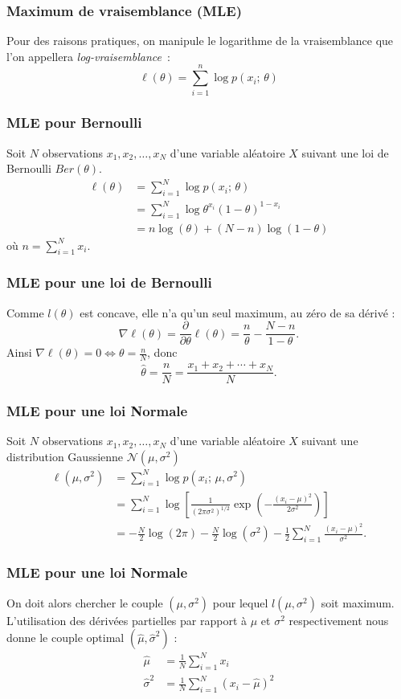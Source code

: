 \begin{frame}
  \frametitle{Maximum de vraisemblance (MLE)}
  Pour des raisons pratiques, on manipule le logarithme de la vraisemblance que l'on appellera \textit{log-vraisemblance}~:
  \[
    \ell(\theta) = \sum_{i=1}^n \log p(x_i; \, \theta)
  \]
\end{frame}

\begin{frame}
  \frametitle{MLE pour Bernoulli}
Soit $N$ observations $x_1,x_2,\ldots,x_N$ d'une variable aléatoire $X$ suivant une loi de Bernoulli $Ber(\theta)$.
\begin{align*}
\ell(\theta) 	&= \sum_{i=1}^N \log p(x_i; \, \theta) \\
				&= \sum_{i=1}^N \log \theta^{x_i}(1-\theta)^{1-x_i}\\
				&= n\log(\theta)+(N-n)\log(1-\theta)
\end{align*} 
où $n=\sum_{i=1}^N x_i$.\\ 
\end{frame}

\begin{frame}
  \frametitle{MLE pour une loi de Bernoulli}
Comme $l(\theta)$ est concave, elle n'a qu'un seul maximum, au zéro de sa dérivé :
$$\nabla \ell(\theta)=\frac{\partial}{\partial\theta} \ell(\theta) = \frac{n}{\theta}-\frac{N-n}{1-\theta}.$$  
Ainsi $\nabla \ell(\theta) = 0 \Longleftrightarrow \theta =\frac{n}{N}$, donc
$$\hat{\theta} = \frac{n}{N} = \frac{x_1+x_2+\cdots+x_N}{N}.$$
\end{frame}

\begin{frame}
  \frametitle{MLE pour une loi Normale}
  Soit $N$ observations $x_1,x_2,\ldots,x_N$ d'une variable aléatoire $X$ suivant une distribution Gaussienne $\mathcal{N}(\mu,\sigma^2)$
\begin{align*}
\ell(\mu,\sigma^2) 	&= \sum_{i=1}^N \log p(x_i; \, \mu,\sigma^2) \\
				&= \sum_{i=1}^N \log\left[ \frac{1}{(2\pi\sigma^2)^{1/2}}\exp\left(-\frac{(x_i-\mu)^2}{2\sigma^2}\right)\right]\\
				&= -\frac{N}{2}\log(2\pi)-\frac{N}{2}\log(\sigma^2)-\frac{1}{2}\sum_{i=1}^N \frac{(x_i-\mu)^2}{\sigma^2}.				
\end{align*} 
\end{frame}

\begin{frame}
  \frametitle{MLE pour une loi Normale}
  On doit alors chercher le couple $(\mu, \sigma^2)$ pour lequel $l(\mu,\sigma^2)$ soit maximum. L'utilisation des dérivées partielles par rapport à $\mu$ et $\sigma^2$ respectivement nous donne le couple optimal $(\hat{\mu},\hat{\sigma}^2)$ :
\begin{align*}
\hat{\mu}&=\frac{1}{N}\sum_{i=1}^N x_i \\
\hat{\sigma}^2&=\frac{1}{N}\sum_{i=1}^N \left(x_i-\hat{\mu}\right)^2
\end{align*}
\end{frame}
